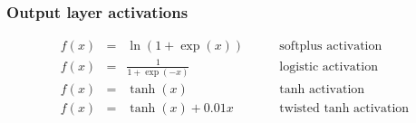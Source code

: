 \documentclass[12pt]{article}
\begin{document}
\subsubsection{\label{sect:outputact} Output layer activations}
% 
\begin{subequations}
\begin{align}
f(x) &= &\ln(1+\exp(x)) \qquad &\text{softplus activation}\label{eqn:softplus}\\
f(x) &= &\frac{1}{1+\exp(-x)} \qquad &\text{logistic activation} \label{eqn:logistic}\\
f(x) &= &\tanh(x) \qquad &\text{tanh activation} \label{eqn:tanh}\\
f(x) &= &\tanh(x) + 0.01x \qquad &\text{twisted tanh activation} \label{eqn:twisttanh}
\end{align}
\label{eqn:activations}
\end{subequations}
%
\end{document}
